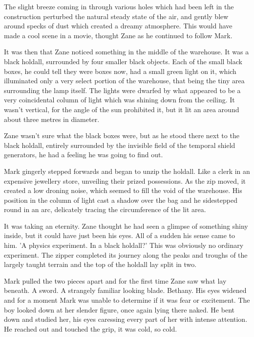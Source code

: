 The slight breeze coming in through various holes which had been left in the construction perturbed the natural steady state of the air, and gently blew around specks of dust which created a dreamy atmosphere.  This would have made a cool scene in a movie, thought Zane as he continued to follow Mark.

It was then that Zane noticed something in the middle of the warehouse.  It was a black holdall, surrounded by four smaller black objects.  Each of the small black boxes, he could tell they were boxes now, had a small green light on it, which illuminated only a very select portion of the warehouse, that being the tiny area surrounding the lamp itself.  The lights were dwarfed by what appeared to be a very coincidental column of light which was shining down from the ceiling.  It wasn't vertical, for the angle of the sun prohibited it, but it lit an area around about three metres in diameter.

Zane wasn't sure what the black boxes were, but as he stood there next to the black holdall, entirely surrounded by the invisible field of the temporal shield generators, he had a feeling he was going to find out.

Mark gingerly stepped forwards and began to unzip the holdall.  Like a clerk in an expensive jewellery store, unveiling their prized possessions.  As the zip moved, it created a low droning noise, which seemed to fill the void of the warehouse.  His position in the column of light cast a shadow over the bag and he sidestepped round in an arc, delicately tracing the circumference of the lit area.

It was taking an eternity.  Zane thought he had seen a glimpse of something shiny inside, but it could have just been his eyes.  All of a sudden his sense came to him.  'A physics experiment.  In a black holdall?'  This was obviously no ordinary experiment.  The zipper completed its journey along the peaks and troughs of the largely taught terrain and the top of the holdall lay split in two.

Mark pulled the two pieces apart and for the first time Zane saw what lay beneath.  A sword.  A strangely familiar looking blade.  Bethany.  His eyes widened and for a moment Mark was unable to determine if it was fear or excitement.  The boy looked down at her slender figure, once again lying there naked.  He bent down and studied her, his eyes caressing every part of her with intense attention.  He reached out and touched the grip, it was cold, so cold.  


